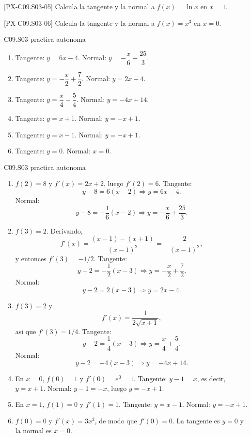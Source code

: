\begin{exercise}{[PX-C09.S03-05] Calcula la tangente y la normal a \(f(x)=\ln x\) en \(x=1\).}
\end{exercise}

\begin{exercise}{[PX-C09.S03-06] Calcula la tangente y la normal a \(f(x)=x^3\) en \(x=0\).}
\end{exercise}

\begin{shortanswer}{C09.S03 practica autonoma}
\begin{enumerate}[label=\textbf{PX-C09.S03-\arabic*:}, leftmargin=*]
  \item Tangente: \(y=6x-4\). Normal: \(y=-\dfrac{x}{6}+\dfrac{25}{3}\).
  \item Tangente: \(y=-\dfrac{x}{2}+\dfrac{7}{2}\). Normal: \(y=2x-4\).
  \item Tangente: \(y=\dfrac{x}{4}+\dfrac{5}{4}\). Normal: \(y=-4x+14\).
  \item Tangente: \(y=x+1\). Normal: \(y=-x+1\).
  \item Tangente: \(y=x-1\). Normal: \(y=-x+1\).
  \item Tangente: \(y=0\). Normal: \(x=0\).
\end{enumerate}
\end{shortanswer}

\begin{fullsolution}{C09.S03 practica autonoma}
\begin{enumerate}[label=\textbf{PX-C09.S03-\arabic*:}, leftmargin=*]
  \item \(f(2)=8\) y \(f'(x)=2x+2\), luego \(f'(2)=6\). Tangente:
  \[
  y-8=6(x-2)\Longrightarrow y=6x-4.
  \]
  Normal:
  \[
  y-8=-\frac{1}{6}(x-2)\Longrightarrow y=-\frac{x}{6}+\frac{25}{3}.
  \]

  \item \(f(3)=2\). Derivando,
  \[
  f'(x)=\frac{(x-1)-(x+1)}{(x-1)^2}=-\frac{2}{(x-1)^2},
  \]
  y entonces \(f'(3)=-1/2\). Tangente:
  \[
  y-2=-\frac{1}{2}(x-3)\Longrightarrow y=-\frac{x}{2}+\frac{7}{2}.
  \]
  Normal:
  \[
  y-2=2(x-3)\Longrightarrow y=2x-4.
  \]

  \item \(f(3)=2\) y
  \[
  f'(x)=\frac{1}{2\sqrt{x+1}},
  \]
  asi que \(f'(3)=1/4\). Tangente:
  \[
  y-2=\frac{1}{4}(x-3)\Longrightarrow y=\frac{x}{4}+\frac{5}{4}.
  \]
  Normal:
  \[
  y-2=-4(x-3)\Longrightarrow y=-4x+14.
  \]

  \item En \(x=0\), \(f(0)=1\) y \(f'(0)=e^0=1\). Tangente: \(y-1=x\), es decir, \(y=x+1\).
  Normal: \(y-1=-x\), luego \(y=-x+1\).

  \item En \(x=1\), \(f(1)=0\) y \(f'(1)=1\). Tangente: \(y=x-1\). Normal: \(y=-x+1\).

  \item \(f(0)=0\) y \(f'(x)=3x^2\), de modo que \(f'(0)=0\). La tangente es \(y=0\) y la
  normal es \(x=0\).
\end{enumerate}
\end{fullsolution}

